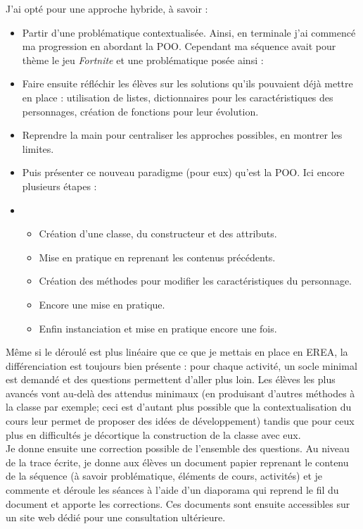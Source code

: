 \documentclass[a4paper,11pt]{article}
\begin{document}
J'ai opté pour une approche hybride, à savoir :
\begin{itemize}
    \item Partir d'une problématique contextualisée. Ainsi, en terminale j'ai commencé ma progression en abordant la POO. Cependant ma séquence avait pour thème le jeu \emph{Fortnite} et une problématique posée ainsi : 
    \item Faire ensuite réfléchir les élèves sur les solutions qu'ils pouvaient déjà mettre en place : utilisation de listes, dictionnaires pour les caractéristiques des personnages, création de fonctions pour leur évolution.
    \item Reprendre la main pour centraliser les approches possibles, en montrer les limites.
    \item Puis présenter ce nouveau paradigme (pour eux) qu'est la POO. Ici encore plusieurs étapes :
    \item \begin{itemize}
        \item Création d'une classe, du constructeur et des attributs.
        \item Mise en pratique en reprenant les contenus précédents.
        \item Création des méthodes pour modifier les caractéristiques du personnage.
        \item Encore une mise en pratique.
        \item Enfin instanciation et mise en pratique encore une fois.
    \end{itemize}
\end{itemize}
Même si le déroulé est plus linéaire que ce que je mettais en place en EREA, la différenciation est toujours bien présente : pour chaque activité, un socle minimal est demandé et des questions permettent d'aller plus loin. Les élèves les plus avancés vont au-delà des attendus minimaux (en produisant d'autres méthodes à la classe par exemple; ceci est d'autant plus possible que la contextualisation du cours leur permet de proposer des idées de développement) tandis que pour ceux plus en difficultés je décortique la construction de la classe avec eux.\\
Je donne ensuite une correction possible de l'ensemble des questions. Au niveau de la trace écrite, je donne aux élèves un document papier reprenant le contenu de la séquence (à savoir problématique, éléments de cours, activités) et je commente et déroule les séances à l'aide d'un diaporama qui reprend le fil du document et apporte les corrections. Ces documents sont ensuite accessibles sur un site web dédié pour une consultation ultérieure.\\
\end{document}
